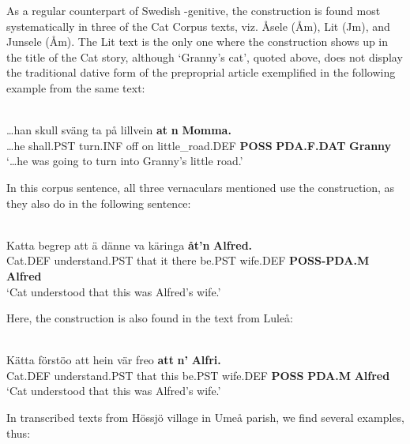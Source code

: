 As a regular counterpart of Swedish -genitive, the  construction is\textit{ }found most systematically in three of the Cat Corpus texts, viz. Åsele (Åm), Lit (Jm), and Junsele (Åm). The Lit text is the only one where the  construction shows up in the title of the Cat story, although ‘Granny’s cat’, quoted above, does not display the traditional dative form  of the preproprial article exemplified in the following example from the same text:

\ea\label{}
\\
\gll …han  skull  sväng  ta  på  lillvein  \textbf{at} \textbf{n} \textbf{Momma.}\\
…he  shall.PST  turn.INF  off  on  little\_road.DEF  \textbf{POSS} \textbf{PDA.F.DAT} \textbf{Granny}\\
\glt ‘…he was going to turn into Granny’s little road.’
\z

In this corpus sentence, all three vernaculars mentioned use the  construction, as they also do in the following sentence:

\ea\label{}
\\
\gll Katta  begrep  att  ä  dänne  va  käringa  \textbf{åt’n} \textbf{Alfred.}\\
Cat.DEF  understand.PST  that  it  there  be.PST  wife.DEF  \textbf{POSS-PDA.M} \textbf{Alfred}\\
\glt ‘Cat understood that this was Alfred’s wife.’
\z

Here, the construction is also found in the text from Luleå:


\ea\label{}
\\
\gll Kätta  förstöo  att  hein  vär  freo  \textbf{att} \textbf{n’} \textbf{Alfri.}\\
Cat.DEF  understand.PST  that  this  be.PST  wife.DEF  \textbf{POSS} \textbf{PDA.M} \textbf{Alfred}\\
\glt ‘Cat understood that this was Alfred’s wife.’
\z

In transcribed texts from Hössjö village in Umeå parish, we find several examples, thus:

